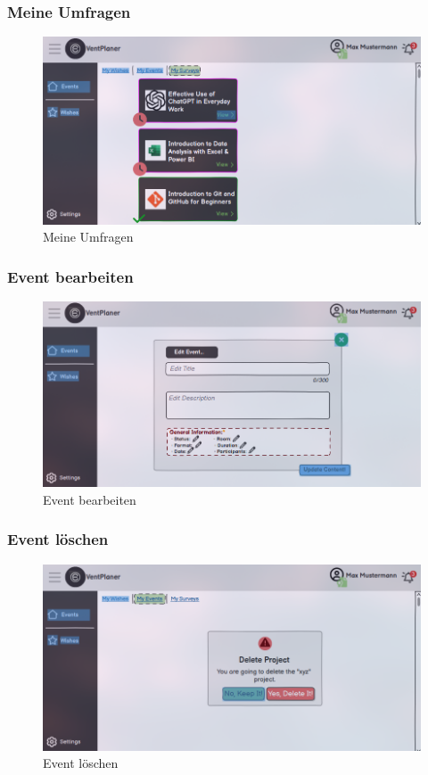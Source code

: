 \documentclass[a4paper,12pt]{article}
\begin{document}
\subsubsection{Meine Umfragen}
\begin{figure}[H]
    \centering
    \includegraphics[width=1\textwidth]{Abbildungen/events/my_surveys.png}
    \caption{Meine Umfragen}
    \label{fig:my_survey}
\end{figure}

\subsubsection{Event bearbeiten}
\begin{figure}[H]
    \centering
    \includegraphics[width=1\textwidth]{Abbildungen/events/edit_event.png}
    \caption{Event bearbeiten}
    \label{fig:cedit_event}
\end{figure}

\subsubsection{Event löschen}
\begin{figure}[H]
    \centering
    \includegraphics[width=1\textwidth]{Abbildungen/events/delete_event.png}
    \caption{Event löschen}
    \label{fig:delet_event}
\end{figure}
\end{document}

